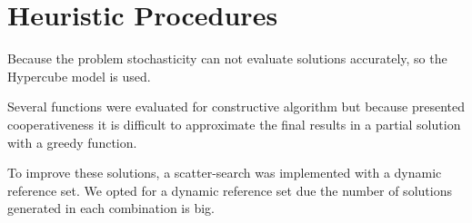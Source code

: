 \chapter{Heuristic Procedures}
Because the problem stochasticity
can not evaluate solutions accurately,
so the Hypercube model is used.

Several functions were evaluated
for constructive algorithm
but because presented cooperativeness
it is difficult
to approximate the final results
in a partial solution
with a greedy function.

To improve these solutions,
a scatter-search was implemented
with a dynamic reference set.
We opted for a dynamic reference set
due the number of solutions generated
in each combination is big.




